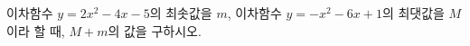\hspace*{2mm}\begin{minipage}[t]{\dimexpr\linewidth-2mm\relax}\vspace{0pt}
이차함수 $y=2x^2-4x-5$의 최솟값을 $m$, 이차함수 $y=-x^2-6x+1$의 최댓값을 $M$이라 할 때, $M+m$의 값을 구하시오.\end{minipage}
